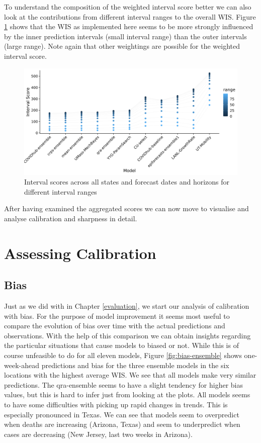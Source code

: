 \documentclass[
]{book}
\begin{document}
To understand the composition of the weighted interval score better we can also look at the contributions from different interval ranges to the overall WIS. Figure \ref{fig:scores-ranges} shows that the WIS as implemented here seems to be more strongly influenced by the inner prediction intervals (small interval range) than the outer intervals (large range). Note again that other weightings are possible for the weighted interval score.

\begin{figure}
\includegraphics[width=1\linewidth]{../visualisation/chapter-5-results/scores-by-range} \caption{Interval scores across all states and forecast dates and horizons for different interval ranges}\label{fig:scores-ranges}
\end{figure}

After having examined the aggregated scores we can now move to visualise and analyse calibration and sharpness in detail.

\hypertarget{assessing-calibration}{%
\section{Assessing Calibration}\label{assessing-calibration}}

\hypertarget{bias}{%
\subsection{Bias}\label{bias}}

Just as we did with in Chapter \ref{evaluation}, we start our analysis of calibration with bias. For the purpose of model improvement it seems most useful to compare the evolution of bias over time with the actual predictions and observations. With the help of this comparison we can obtain insights regarding the particular situations that cause models to biased or not. While this is of course unfeasible to do for all eleven models, Figure \ref{fig:bias-ensemble} shows one-week-ahead predictions and bias for the three ensemble models in the six locations with the highest average WIS. We see that all models make very similar predictions. The qra-ensemble seems to have a slight tendency for higher bias values, but this is hard to infer just from looking at the plots.
All models seems to have some difficulties with picking up rapid changes in trends. This is especially pronounced in Texas. We can see that models seem to overpredict when deaths are increasing (Arizona, Texas) and seem to underpredict when cases are decreasing (New Jersey, last two weeks in Arizona).
\end{document}
